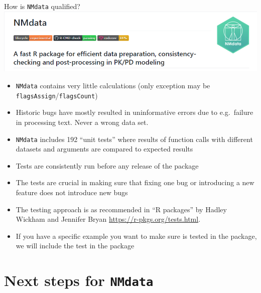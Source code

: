 \documentclass[
  8pt,
  ignorenonframetext,
  aspectratio=169]{beamer}
\begin{document}
\begin{frame}[fragile]{How is \texttt{NMdata} qualified?}
\protect\hypertarget{how-is-nmdata-qualified}{}
\includegraphics[width=.8\textwidth]{badges_snip_210623}

\begin{itemize}
\item
  \texttt{NMdata} contains very little calculations (only exception may
  be \texttt{flagsAssign}/\texttt{flagsCount})
\item
  Historic bugs have mostly resulted in uninformative errors due to
  e.g.~failure in processing text. Never a wrong data set.
\item
  \texttt{NMdata} includes 192 ``unit tests'' where results of function
  calls with different datasets and arguments are compared to expected
  results
\item
  Tests are consistently run before any release of the package
\item
  The tests are crucial in making sure that fixing one bug or
  introducing a new feature does not introduce new bugs
\item
  The testing approach is as recommended in ``R packages'' by Hadley
  Wickham and Jennifer Bryan \url{https://r-pkgs.org/tests.html}.
\item
  If you have a specific example you want to make sure is tested in the
  package, we will include the test in the package
\end{itemize}
\end{frame}

\hypertarget{next-steps-for-nmdata}{%
\section{\texorpdfstring{Next steps for
\texttt{NMdata}}{Next steps for NMdata}}\label{next-steps-for-nmdata}}
\end{document}
